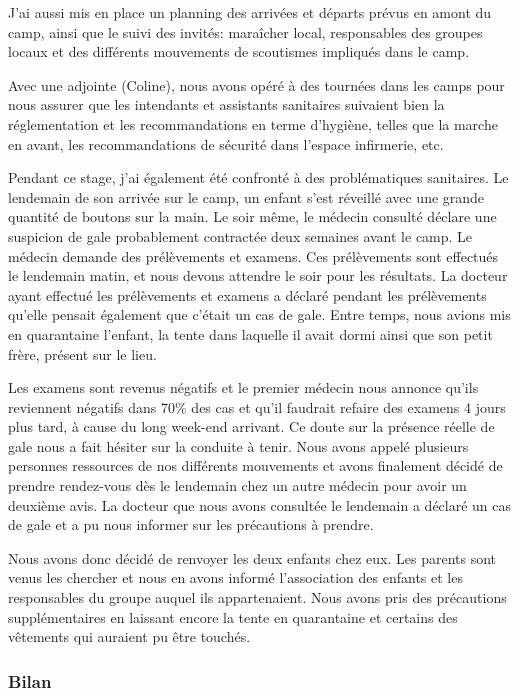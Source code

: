 \documentclass[titlepage,11pt,a4paper]{article}
\begin{document}
J'ai aussi mis en place un planning des arrivées et départs prévus en amont du camp, ainsi
que le suivi des invités: maraîcher local, responsables des groupes locaux et des
différents mouvements de scoutismes impliqués dans le camp.

Avec une adjointe (Coline), nous avons opéré à des tournées dans les camps pour nous
assurer que les intendants et assistants sanitaires suivaient bien la réglementation et
les recommandations en terme d'hygiène, telles que la marche en avant, les recommandations
de sécurité dans l'espace infirmerie, etc.

Pendant ce stage, j'ai également été confronté à des problématiques
sanitaires. Le lendemain de son arrivée sur le camp, un enfant s'est réveillé avec une
grande quantité de boutons sur la main. Le soir même, le médecin consulté déclare une
suspicion de gale probablement contractée deux semaines avant le camp. Le médecin demande
des prélèvements et examens. Ces prélèvements sont effectués
le lendemain matin, et nous devons attendre le soir pour les résultats. La docteur ayant
effectué les prélèvements et examens a déclaré pendant les prélèvements qu'elle pensait
également que c'était un cas de gale. Entre temps, nous avions mis en quarantaine
l'enfant, la tente dans laquelle il avait dormi ainsi que son petit frère, présent sur le
lieu.

Les examens sont revenus négatifs et le premier médecin nous annonce qu'ils reviennent
négatifs dans 70\% des cas et qu'il faudrait refaire des examens 4 jours plus tard, à cause du long
week-end arrivant. Ce doute sur la présence réelle de gale nous a fait hésiter sur la
conduite à tenir. Nous avons appelé plusieurs personnes ressources de nos différents
mouvements et avons finalement décidé de prendre rendez-vous dès le lendemain chez un
autre médecin pour avoir un deuxième avis. La docteur que nous avons consultée le
lendemain a déclaré un cas de gale et a pu nous informer sur les précautions à prendre.

Nous avons donc décidé de renvoyer les deux enfants chez eux. Les parents sont venus les
chercher et nous en avons informé l'association des enfants et les responsables du groupe
auquel ils appartenaient. Nous avons pris des précautions supplémentaires en laissant
encore la tente en quarantaine et certains des vêtements qui auraient pu être touchés.

\subsubsection{Bilan}
\end{document}
